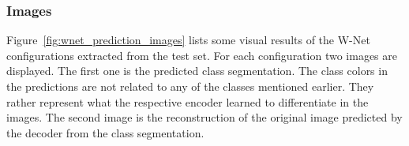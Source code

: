 \subsubsection{Images}
Figure~\ref{fig:wnet_prediction_images} lists some visual results of the W-Net configurations extracted from the test set. For each configuration two images are displayed. The first one is the predicted class segmentation. The class colors in the predictions are not related to any of the classes mentioned earlier. They rather represent what the respective encoder learned to differentiate in the images. The second image is the reconstruction of the original image predicted by the decoder from the class segmentation.

\begin{figure}[h]
    \newcommand{\WnetPredictionsImageWidth}{0.18\textwidth}
    \centering


\end{figure}

